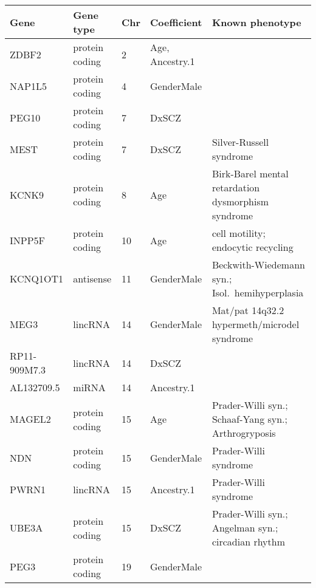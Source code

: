 \begin{tabular}{lllll}
Gene & Gene type & Chr & Coefficient & Known phenotype\\
\hline
ZDBF2 & protein coding & 2 & Age,  Ancestry.1 & \\
NAP1L5 & protein coding & 4 & GenderMale & \\
PEG10 & protein coding & 7 & DxSCZ & \\
MEST & protein coding & 7 & DxSCZ & Silver-Russell syndrome\\
KCNK9 & protein coding & 8 & Age & Birk-Barel mental retardation dysmorphism syndrome\\
INPP5F & protein coding & 10 & Age & cell motility; endocytic recycling\\
KCNQ1OT1 & antisense & 11 & GenderMale & Beckwith-Wiedemann syn.; Isol.~hemihyperplasia\\
MEG3 & lincRNA & 14 & GenderMale & Mat/pat 14q32.2 hypermeth/microdel syndrome\\
RP11-909M7.3 & lincRNA & 14 & DxSCZ & \\
AL132709.5 & miRNA & 14 & Ancestry.1 & \\
MAGEL2 & protein coding & 15 & Age & Prader-Willi syn.; Schaaf-Yang syn.;
Arthrogryposis \\
NDN & protein coding & 15 & GenderMale & Prader-Willi syndrome\\
PWRN1 & lincRNA & 15 & Ancestry.1 & Prader-Willi syndrome\\
UBE3A & protein coding & 15 & DxSCZ & Prader-Willi syn.; Angelman syn.; circadian rhythm\\
PEG3 & protein coding & 19 & GenderMale & \\
\end{tabular}
